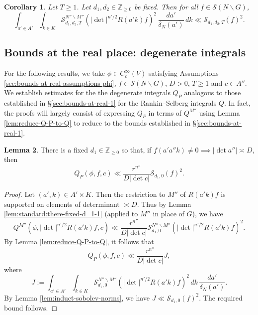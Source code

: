 \documentclass[reqno]{amsart}
\theoremstyle{plain} \newtheorem{theorem} {Theorem}
\newtheorem{corollary} [theorem] {Corollary}
\theoremstyle{definition} \newtheorem{definition} [theorem] {Definition}
\theoremstyle{itplain} %
\newtheorem{lemma}[theorem]{Lemma}
\numberwithin{equation}{section}
\numberwithin{theorem}{section}
\renewcommand{\geq}{\geqslant}
\begin{document}
\begin{corollary}\label{cor:standard:induct-sobolev-norms}
  Let $T \geq 1$.  Let $d_1, d_2 \in \mathbb{Z}_{\geq 0}$ be fixed.  Then for all $f \in \mathcal{S}(N \backslash G)$,
  \begin{equation*}
    \int _{a' \in A'}
    \int _{k \in K}
    \mathcal{S} _{d_1, d_2,T} ^{N'' \backslash M''}
    \left(
      |\det|^{n'/2}
      R(a' k) f
    \right)^2
    \, \frac{d a '}{\delta_N(a')} \, d k
    \ll
    \mathcal{S}_{d_1,d_2,T}(f)^2.
  \end{equation*}
\end{corollary}

\subsection{Bounds at the real place: degenerate integrals}\label{sec:bounds-at-real-2}
For the following results, we take $\phi \in C_c^\infty(V)$ satisfying Assumptions \ref{sec:bounds-at-real-assumptions-phi}, $f \in \mathcal{S}(N \backslash G)$, $D > 0$, $T \geq 1$ and $c \in A''$.  We establish estimates for the the degenerate integrals $Q_P$ analogous to those established in \S\ref{sec:bounds-at-real-1} for the Rankin--Selberg integrals $Q$.  In fact, the proofs will largely consist of expressing $Q_P$ in terms of $Q^{M''}$ using Lemma \ref{lem:reduce-Q-P-to-Q} to reduce to the bounds established in \S\ref{sec:bounds-at-real-1}.


\begin{lemma}\label{lem:sub-gln:there-fixed-x-3}
  There is a fixed $d_1 \in \mathbb{Z}_{\geq 0}$ so that, if $f(a' a'' k) \neq 0 \implies |\det a''| \asymp D$, then  
  \begin{equation*}
    Q_P(\phi,f,c) \ll \frac{r^{n''}}{D |\det c|} \mathcal{S}_{d_1,0}(f)^2.
  \end{equation*}
\end{lemma}
\begin{proof}
  Let $(a', k) \in A' \times K$.  Then the restriction to $M''$ of $R(a' k) f$ is supported on elements of determinant $\asymp D$.  Thus by Lemma \ref{lem:standard:there-fixed-d_1-1} (applied to $M''$ in place of $G$), we have
  \begin{equation*}
    Q^{M''}(\phi, |\det|^{n'/2 }R(a' k) f, c)
    \ll
    \frac{r^{n''}}{D |\det c|}
    \mathcal{S}_{d_1,0}^{N'' \backslash M''}\left(|\det |^{n'/2} R(a' k) f\right)^2.
  \end{equation*}
  By Lemma \ref{lem:reduce-Q-P-to-Q}, it follows that
  \begin{equation*}
    Q_P(\phi, f, c) \ll \frac{r^{n''}}{D |\det c|} J,
  \end{equation*}
  where
  \begin{equation*}
    J := 
    \int _{a ' \in A'}
    \int _{k \in K}
    \mathcal{S}_{d_1,0}^{N'' \backslash M''}\left(|\det|^{n'/2} R(a' k) f\right)^2
    \, d k
    \, \frac{d a '}{\delta_N(a')}.
  \end{equation*}
  By Lemma \ref{lem:induct-sobolev-norms}, we have $J \ll \mathcal{S}_{d_1,0}(f)^2$.  The required bound follows.
\end{proof}
\end{document}
